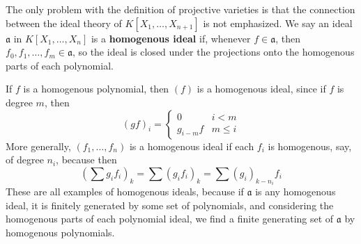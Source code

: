 The only problem with the definition of projective varieties is that the connection between the ideal theory of $K[X_1, \dots, X_{n+1}]$ is not emphasized. We say an ideal $\mathfrak{a}$ in $K[X_1, \dots, X_n]$ is a {\bf homogenous ideal} if, whenever $f \in \mathfrak{a}$, then $f_0,f_1, \dots, f_m \in \mathfrak{a}$, so the ideal is closed under the projections onto the homogenous parts of each polynomial.

\begin{example}
    If $f$ is a homogenous polynomial, then $(f)$ is a homogenous ideal, since if $f$ is degree $m$, then
    \[ (gf)_i = \begin{cases} 0 & i < m \\ g_{i-m}f & m \leq i \end{cases} \]
    More generally, $(f_1, \dots, f_n)$ is a homogenous ideal if each $f_i$ is homogenous, say, of degree $n_i$, because then
    \[ \left(\sum g_if_i \right)_k = \sum (g_if_i)_k = \sum (g_i)_{k - n_i} f_i \]
    These are all examples of homogenous ideals, because if $\mathfrak{a}$ is any homogenous ideal, it is finitely generated by some set of polynomials, and considering the homogenous parts of each polynomial ideal, we find a finite generating set of $\mathfrak{a}$ by homogenous polynomials.
\end{example}


